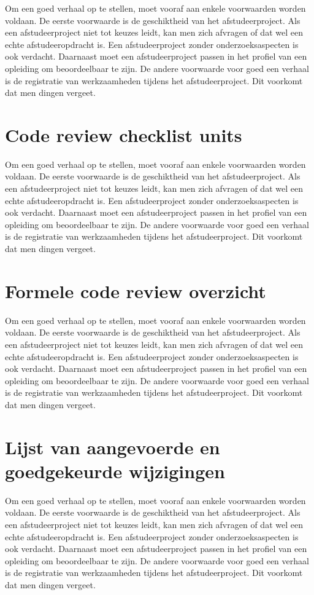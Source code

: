 			Om een goed verhaal op te stellen, moet vooraf aan enkele voorwaarden
			worden voldaan. De eerste voorwaarde is de geschiktheid van het
			afstudeerproject. Als een afstudeerproject niet tot keuzes leidt, kan
			men zich afvragen of dat wel een echte afstudeeropdracht is. Een
			afstudeerproject zonder onderzoeksaspecten is ook verdacht. Daarnaast
			moet een afstudeerproject passen in het profiel van een opleiding om
			beoordeelbaar te zijn. De andere voorwaarde voor goed een verhaal is
			de registratie van werkzaamheden tijdens het afstudeerproject. Dit
			voorkomt dat men dingen vergeet.
			\section{Code review checklist units
			}
			
			Om een goed verhaal op te stellen, moet vooraf aan enkele voorwaarden
			worden voldaan. De eerste voorwaarde is de geschiktheid van het
			afstudeerproject. Als een afstudeerproject niet tot keuzes leidt, kan
			men zich afvragen of dat wel een echte afstudeeropdracht is. Een
			afstudeerproject zonder onderzoeksaspecten is ook verdacht. Daarnaast
			moet een afstudeerproject passen in het profiel van een opleiding om
			beoordeelbaar te zijn. De andere voorwaarde voor goed een verhaal is
			de registratie van werkzaamheden tijdens het afstudeerproject. Dit
			voorkomt dat men dingen vergeet.
			\section{Formele code review overzicht}
			
			Om een goed verhaal op te stellen, moet vooraf aan enkele voorwaarden
			worden voldaan. De eerste voorwaarde is de geschiktheid van het
			afstudeerproject. Als een afstudeerproject niet tot keuzes leidt, kan
			men zich afvragen of dat wel een echte afstudeeropdracht is. Een
			afstudeerproject zonder onderzoeksaspecten is ook verdacht. Daarnaast
			moet een afstudeerproject passen in het profiel van een opleiding om
			beoordeelbaar te zijn. De andere voorwaarde voor goed een verhaal is
			de registratie van werkzaamheden tijdens het afstudeerproject. Dit
			voorkomt dat men dingen vergeet.
			\section{Lijst van aangevoerde en goedgekeurde wijzigingen}
			
			Om een goed verhaal op te stellen, moet vooraf aan enkele voorwaarden
			worden voldaan. De eerste voorwaarde is de geschiktheid van het
			afstudeerproject. Als een afstudeerproject niet tot keuzes leidt, kan
			men zich afvragen of dat wel een echte afstudeeropdracht is. Een
			afstudeerproject zonder onderzoeksaspecten is ook verdacht. Daarnaast
			moet een afstudeerproject passen in het profiel van een opleiding om
			beoordeelbaar te zijn. De andere voorwaarde voor goed een verhaal is
			de registratie van werkzaamheden tijdens het afstudeerproject. Dit
			voorkomt dat men dingen vergeet.
